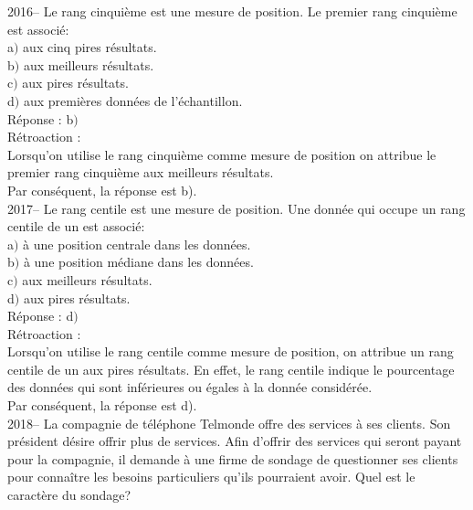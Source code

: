 \documentclass[letterpaper, 12pt]{article}
\begin{document}

2016-- Le rang cinqui\`eme est une mesure de position. Le premier rang cinqui\`eme est associ\'e: \\

a$)$ aux cinq pires r\'esultats.\\
b$)$ aux meilleurs r\'esultats.\\
c$)$ aux pires r\'esultats.\\
d$)$ aux premi\`eres donn\'ees de l'\'echantillon.\\

R\'eponse : b$)$\\

R\'etroaction :\\
Lorsqu'on utilise le rang cinqui\`eme comme mesure de position on attribue le premier rang cinqui\`eme aux meilleurs r\'esultats.\\
Par cons\'equent, la r\'eponse est b).\\

2017-- Le rang centile est une mesure de position. Une donn\'ee qui occupe un rang centile de un est associ\'e: \\

a$)$ \`a une position centrale dans les donn\'ees.\\
b$)$ \`a une position m\'ediane dans les donn\'ees.\\
c$)$ aux meilleurs r\'esultats.\\
d$)$ aux pires r\'esultats.\\

R\'eponse : d$)$\\

R\'etroaction :\\
Lorsqu'on utilise le rang centile comme mesure de position, on attribue un rang centile de un aux pires r\'esultats. En effet, le rang centile indique le pourcentage des donn\'ees qui sont inf\'erieures ou \'egales \`a la donn\'ee consid\'er\'ee. \\
Par cons\'equent, la r\'eponse est d).\\


2018-- La compagnie de t\'el\'ephone Telmonde offre des services \`a ses clients. Son pr\'esident d\'esire offrir plus de services. Afin d'offrir des services qui seront payant pour la compagnie, il demande \`a une firme de sondage de questionner ses clients pour conna\^itre les besoins particuliers qu'ils pourraient avoir. Quel est le caract\`ere du sondage? \\
\end{document}
